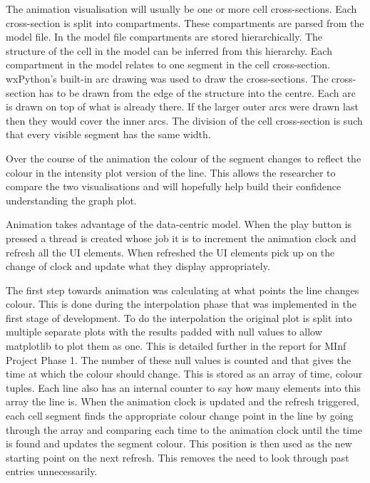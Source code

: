 The animation visualisation will usually be one or more cell cross-sections.  Each cross-section is split into compartments. These compartments are parsed from the model file.  In the model file compartments are stored hierarchically.  The structure of the cell in the model can be inferred from this hierarchy.  Each compartment in the model relates to one segment in the cell cross-section.  wxPython's built-in arc drawing was used to draw the cross-sections.  The cross-section has to be drawn from the edge of the structure into the centre.  Each arc is drawn on top of what is already there.  If the larger outer arcs were drawn last then they would cover the inner arcs.  The division of the cell cross-section is such that every visible segment has the same width.

Over the course of the animation the colour of the segment changes to reflect the colour in the intensity plot version of the line.  This allows the researcher to compare the two visualisations and will hopefully help build their confidence understanding the graph plot.

Animation takes advantage of the data-centric model.  When the play button is pressed a thread is created whose job it is to increment the animation clock and refresh all the \ac{UI} elements.  When refreshed the \ac{UI} elements pick up on the change of clock and update what they display appropriately.

The first step towards animation was calculating at what points the line changes colour.  This is done during the interpolation phase that was implemented in the first stage of development.  To do the interpolation the original plot is split into multiple separate plots with the results padded with null values to allow matplotlib to plot them as one.  This is detailed further in the report for MInf Project Phase 1.  The number of these null values is counted and that gives the time at which the colour should change.  This is stored as an array of time, colour tuples.  Each line also has an internal counter to say how many elements into this array the line is.  When the animation clock is updated and the refresh triggered, each cell segment finds the appropriate colour change point in the line by going through the array and comparing each time to the animation clock until the time is found and updates the segment colour.  This position is then used as the new starting point on the next refresh.  This removes the need to look through past entries unnecessarily.


